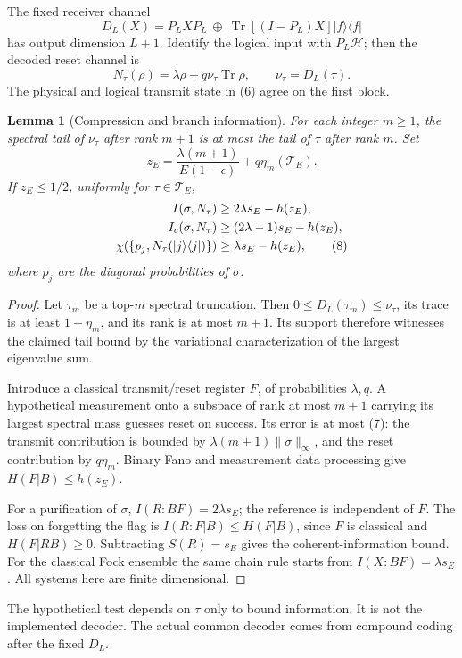 \documentclass[11pt]{article}
\newtheorem{lemma}[theorem]{Lemma}
\newcommand{\Tr}{\operatorname{Tr}}
\newcommand{\Tcal}{\mathcal T}
\begin{document}
The fixed receiver channel
\[
 D_L(X)=P_LXP_L\ \oplus\ \Tr[(I-P_L)X]|f\rangle\langle f|
\]
has output dimension \(L+1\).
Identify the logical input with \(P_L\mathcal H\); then the decoded reset
channel is
\[
 N_\tau(\rho)=\lambda\rho+q\nu_\tau\Tr\rho,\qquad
 \nu_\tau=D_L(\tau).                                          \tag{6}
\]
The physical and logical transmit state in (6) agree on the first block.

\begin{lemma}[Compression and branch information]\label{lem:branch}
For each integer \(m\ge1\), the spectral tail of \(\nu_\tau\) after rank
\(m+1\) is at most the tail of \(\tau\) after rank \(m\).
Set
\[
 z_E=\frac{\lambda(m+1)}{E(1-\epsilon)}
                    +q\eta_m(\Tcal_E).                        \tag{7}
\]
If \(z_E\le1/2\), uniformly for \(\tau\in\Tcal_E\),
\begin{align}
 I(\sigma,N_\tau)&\ge2\lambda s_E-h(z_E),\notag\\
 I_c(\sigma,N_\tau)&\ge(2\lambda-1)s_E-h(z_E),\notag\\
 \chi(\{p_j,N_\tau(|j\rangle\langle j|)\})&
                 \ge\lambda s_E-h(z_E),                       \tag{8}
\end{align}
where \(p_j\) are the diagonal probabilities of \(\sigma\).
\end{lemma}
\begin{proof}
Let \(\tau_m\) be a top-\(m\) spectral truncation. Then
\(0\le D_L(\tau_m)\le\nu_\tau\), its trace is at least
\(1-\eta_m\), and its rank is at most \(m+1\). Its support therefore
witnesses the claimed tail bound by the variational characterization
of the largest eigenvalue sum.

Introduce a classical transmit/reset register \(F\), of probabilities
\(\lambda,q\). A hypothetical measurement onto a subspace of rank at most \(m+1\)
carrying its largest spectral mass guesses reset on success. Its error is at most (7):
the transmit contribution is bounded by
\(\lambda(m+1)\|\sigma\|_\infty\), and the reset contribution by \(q\eta_m\).
Binary Fano and measurement data processing give \(H(F|B)\le h(z_E)\).

For a purification of \(\sigma\), \(I(R:BF)=2\lambda s_E\);
the reference is independent of \(F\).
The loss on forgetting the flag is
\(I(R:F|B)\le H(F|B)\), since \(F\) is classical and
\(H(F|RB)\ge0\). Subtracting \(S(R)=s_E\) gives the coherent-information
bound. For the classical Fock ensemble the same chain rule starts from
\(I(X:BF)=\lambda s_E\). All systems here are finite dimensional.
\end{proof}
The hypothetical test depends on \(\tau\) only to bound information.
It is not the implemented decoder. The actual common decoder comes
from compound coding after the fixed \(D_L\).
\end{document}
